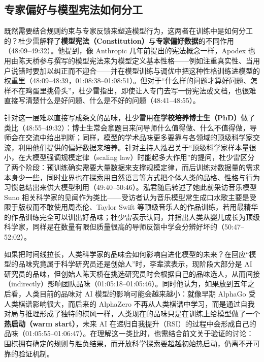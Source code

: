 \documentclass[UTF8,a4paper,11pt,fontset=fandol]{ctexart}
\begin{document}
\subsection{专家偏好与模型宪法如何分工}
既然需要结合规则约束与专家反馈来塑造模型行为，这两者在训练中是如何分工的？杜少雷解释了\textbf{模型宪法（Constitution）}与\textbf{专家偏好数据}的不同作用（48:09–49:32）。他提到，像 Anthropic 几年前提出的宪法概念一样，Apodex 也用由陈天桥参与撰写的模型宪法来为模型定义基本性格——例如注重真实性、当用户说错时要加以纠正而不迎合——并在模型训练与调优中把这种性格训练进模型的权重里（48:09–48:39，01:08:38–01:08:51）。但对于“什么样的问题才算好问题、怎样不在鸡蛋里挑骨头”，杜少雷指出，即使让人专门去写一份宪法或文档，也很难直接写清楚什么是好问题、什么是不好的问题（48:41–48:55）。

针对这一层难以直接写成条文的品味，杜少雷用\textbf{在学校培养博士生（PhD）}做了类比（48:55–49:32）：博士生常会拿题目来问导师什么值得做、什么不值得做，导师会在交流中给出判断；同样，模型的学术品味更多要靠与各领域的顶级科学家交流，利用他们提供的偏好数据来培养。针对主持人泓君关于“顶级科学家样本量很小，在大模型强调规模定律（scaling law）时能起多大作用”的提问，杜少雷区分了两个阶段：预训练确实需要大量数据来支撑规模定律，而后训练对数据量的需求本身少一些，同时业界也在探索用自然语言等方式把个体人类的品格、性格与行为习惯总结出来供大模型利用（49:40–50:46）。泓君随后转述了她此前采访音乐模型 Suno 相关科学家的见闻作为类比——受访者认为音乐模型常生成口水歌主要是受限于版权而不敢使用周杰伦、Taylor Swift 等顶级音乐人的作品训练，若用最精华的作品训练完全可以训出好品味；杜少雷表示认同，并指出人类从婴儿成长为顶级科学家，同样是在数量有限但质量很高的导师反馈中学会分辨好坏的（50:47–52:02）。

如果把时间线拉长，人类科学家的品味会如何影响自进化模型的未来？在回应“模型的品味究竟属于科学研究员还是创始人”时，李辈滨表示，现阶段大部分是 AI 研究员的品味，但创始人陈天桥在挑选研究员时会根据自己的品味选人，从而间接（indirectly）影响团队品味（01:05:18–01:05:46）。同时他认为，如果放到五年之后看，人类目前的品味对 AI 模型的影响可能会越来越小：就像早期 AlphaGo 受人类棋谱影响很大，而后来的 AlphaZero 不再从人类棋谱中学习，而是通过自我对局与推理形成了独特的棋风一样，人类现在的品味只是在训练上给模型做了一个\textbf{热启动（warm start）}，未来 AI 在递归自我提升（RSI）的过程中会形成自己的品味（01:05:55–01:06:47）。在理解这一类比时，也需结合前文关于验证的讨论：围棋拥有确定的规则与胜负结果，而开放科学探索要超越初始热启动，仍离不开可靠的验证机制。
\end{document}
